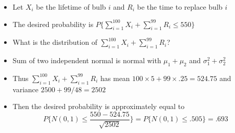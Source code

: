 \documentclass[slidestop,compress,mathserif]{beamer}
\begin{document}
\begin{frame}

{\small{
\begin{itemize}
\item Let $X_i$ be the lifetime of bulb $i$ and $R_i$ be the time to replace bulb $i$
\pause
\item The desired probability is $P\{\sum_{i=1}^{100}X_i + \sum_{i=1}^{99}R_i \leq 550\}$
\item What is the distribution of $\sum_{i=1}^{100}X_i + \sum_{i=1}^{99}R_i$?
\pause
\item Sum of two independent normal is normal with $\mu_1+\mu_2$ and $\sigma_1^2 + \sigma_2^2$
\pause
\item Thus $\sum_{i=1}^{100}X_i + \sum_{i=1}^{99}R_i$ has mean $100\times 5 + 99\times .25 = 524.75$ and variance $2500 + 99/48 = 2502$
\item Then the desired probability is approximately equal to
$$P\{N(0, 1) \leq \frac{550 - 524.75}{\sqrt{2502}}\} = P\{N(0, 1) \leq .505\} = .693$$
\end{itemize}

}}
\end{frame}
%
%
%
%
\end{document}
